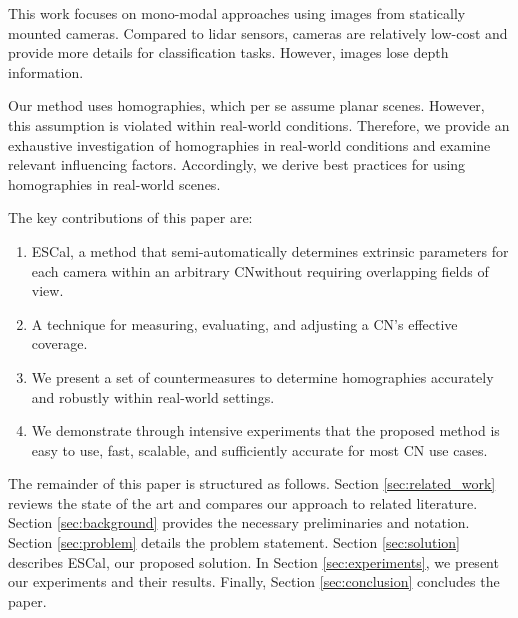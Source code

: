 This work focuses on mono-modal approaches using images from statically 
mounted cameras. Compared to lidar sensors, cameras are relatively low-cost 
and provide more details for classification tasks. However, images lose 
depth information. 

Our method uses homographies, which per se assume planar scenes. However, 
this assumption is violated within real-world conditions. 
Therefore, we provide an exhaustive investigation of 
homographies in real-world conditions and examine relevant influencing factors. 
Accordingly, we derive best practices for using homographies in real-world 
scenes.

The key contributions of this paper are:
\begin{enumerate}
	\item ESCal, a method that semi-automatically determines extrinsic parameters for 
		each camera within an arbitrary CN\textemdash without requiring overlapping fields of view.
	\item A technique for measuring, evaluating, and adjusting a CN's effective 
		coverage.
	\item We present a set of countermeasures to determine homographies 
		accurately and robustly within real-world settings. 
	\item We demonstrate through intensive experiments that the proposed method 
		is easy to use, fast, scalable, and sufficiently accurate for most 
		CN use cases.
\end{enumerate}

The remainder of this paper is structured as follows.
Section \ref{sec:related_work} reviews the state of the art and compares 
our approach to related literature. Section \ref{sec:background} provides 
the necessary preliminaries and notation. Section \ref{sec:problem} details 
the problem statement. Section \ref{sec:solution} describes ESCal, our proposed 
solution. In Section \ref{sec:experiments}, we present our experiments and 
their results. Finally, Section \ref{sec:conclusion} concludes the paper.
